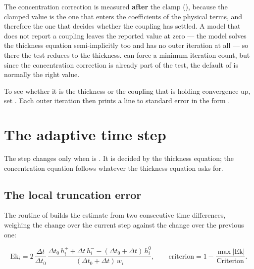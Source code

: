 The concentration correction is measured \textbf{after} the clamp
(), because the clamped value is the one that enters the
coefficients of the physical terms, and therefore the one that decides whether
the coupling has settled. A model that does not report a coupling leaves the
reported value at zero --- the  model solves the thickness equation
semi-implicitly too and has no outer iteration at all --- so there the test
reduces to the thickness.  can force a minimum iteration count,
but since the concentration correction is already part of the test, the default
of  is normally the right value.

To see whether it is the thickness or the coupling that is holding convergence
up, set . Each outer iteration then prints a line
to standard error in the form
.

\section{The adaptive time step}
\label{sec:time:dt}

The step changes only when  is
. It is decided by the thickness equation; the concentration equation
follows whatever the thickness equation asks for.

\subsection{The local truncation error}

The routine  of  builds
the estimate from two consecutive time differences, weighing the change over
the current step against the change over the previous one:

\begin{equation}\label{eq:lte}
  \mathrm{Ek}_i = 2\,\frac{\Delta t}{\Delta t_0}\,
    \frac{\Delta t_0\,h^{+}_{i} + \Delta t\,h^{-}_{i}
          - (\Delta t_0+\Delta t)\,h^{0}_{i}}
         {(\Delta t_0+\Delta t)\,w_i},
  \qquad
  \mathrm{criterion} = 1 - \frac{\max\lvert\mathrm{Ek}\rvert}
                                {\mathrm{Criterion}}.
\end{equation}

